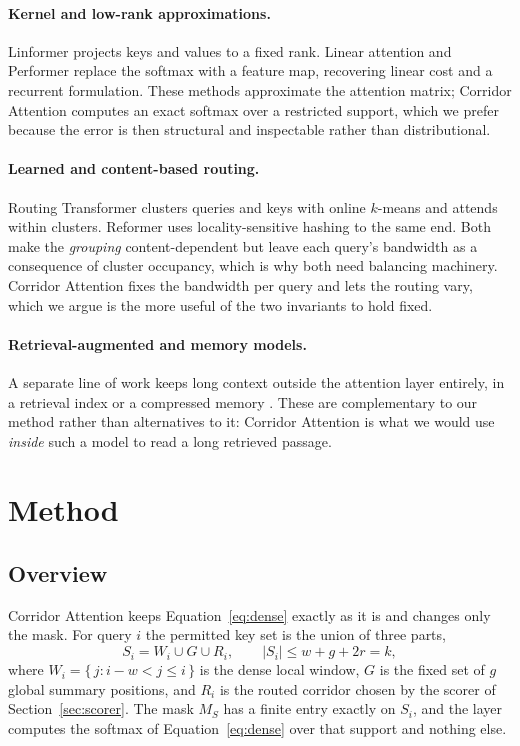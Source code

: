 \documentclass[11pt]{article}
\begin{document}
\paragraph{Kernel and low-rank approximations.} Linformer
\citep{wang2020linformer} projects keys and values to a fixed rank. Linear
attention \citep{katharopoulos2020linear} and Performer
\citep{choromanski2021performer} replace the softmax with a feature map,
recovering linear cost and a recurrent formulation. These methods approximate
the attention matrix; Corridor Attention computes an exact softmax over a
restricted support, which we prefer because the error is then structural and
inspectable rather than distributional.

\paragraph{Learned and content-based routing.} Routing Transformer
\citep{roy2021efficient} clusters queries and keys with online $k$-means and
attends within clusters. Reformer \citep{kitaev2020reformer} uses
locality-sensitive hashing to the same end. Both make the \emph{grouping}
content-dependent but leave each query's bandwidth as a consequence of cluster
occupancy, which is why both need balancing machinery. Corridor Attention fixes
the bandwidth per query and lets the routing vary, which we argue is the more
useful of the two invariants to hold fixed.

\paragraph{Retrieval-augmented and memory models.} A separate line of work
keeps long context outside the attention layer entirely, in a retrieval index
or a compressed memory \citep{rae2020compressive,borgeaud2022improving}. These
are complementary to our method rather than alternatives to it: Corridor
Attention is what we would use \emph{inside} such a model to read a long
retrieved passage.

\section{Method}\label{sec:method}

\subsection{Overview}\label{sec:overview}

Corridor Attention keeps Equation~\eqref{eq:dense} exactly as it is and
changes only the mask. For query $i$ the permitted key set is the union of
three parts,
\begin{equation}\label{eq:support}
  S_i = W_i \cup G \cup R_i, \qquad |S_i| \le w + g + 2r = k,
\end{equation}
where $W_i = \{\, j : i - w < j \le i \,\}$ is the dense local window, $G$ is
the fixed set of $g$ global summary positions, and $R_i$ is the routed
corridor chosen by the scorer of Section~\ref{sec:scorer}. The mask $M_S$ has
a finite entry exactly on $S_i$, and the layer computes the softmax of
Equation~\eqref{eq:dense} over that support and nothing else.
\end{document}
